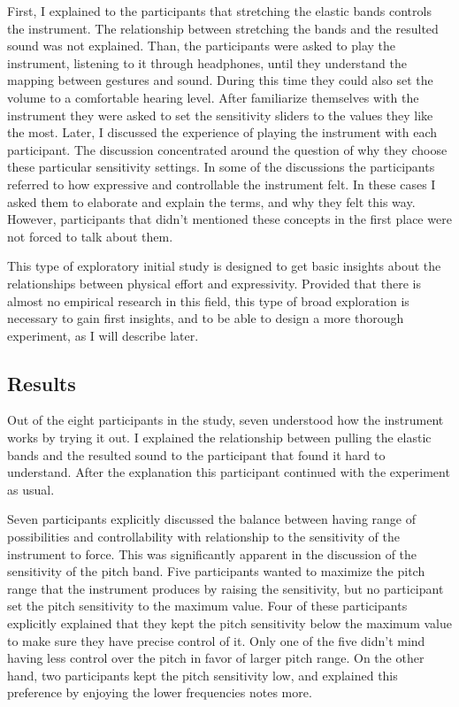 \documentclass{sigchi}
\begin{document}
First, I explained to the participants that stretching the elastic bands controls the instrument.
The relationship between stretching the bands and the resulted sound was not explained.
Than, the participants were asked to play the instrument, listening to it through headphones, until they understand the mapping between gestures and sound.
During this time they could also set the volume to a comfortable hearing level.
After familiarize themselves with the instrument they were asked to set the sensitivity sliders to the values they like the most.
Later, I discussed the experience of playing the instrument with each participant.
The discussion concentrated around the question of why they choose these particular sensitivity settings.
In some of the discussions the participants referred to how expressive and controllable the instrument felt.
In these cases I asked them to elaborate and explain the terms, and why they felt this way.
However, participants that didn't mentioned these concepts in the first place were not forced to talk about them.

This type of exploratory initial study is designed to get basic insights about the relationships between physical effort and expressivity.
Provided that there is almost no empirical research in this field, this type of broad exploration is necessary to gain first insights, and to be able to design a more thorough experiment, as I will describe later.

\subsection{Results}

Out of the eight participants in the study, seven understood how the instrument works by trying it out.
I explained the relationship between pulling the elastic bands and the resulted sound to the participant that found it hard to understand.
After the explanation this participant continued with the experiment as usual.

Seven participants explicitly discussed the balance between having range of possibilities and controllability with relationship to the sensitivity of the instrument to force.
This was significantly apparent in the discussion of the sensitivity of the pitch band.
Five participants wanted to maximize the pitch range that the instrument produces by raising the sensitivity, but no participant set the pitch sensitivity to the maximum value.
Four of these participants explicitly explained that they kept the pitch sensitivity below the maximum value to make sure they have precise control of it.
Only one of the five didn't mind having less control over the pitch in favor of larger pitch range.
On the other hand, two participants kept the pitch sensitivity low, and explained this preference by enjoying the lower frequencies notes more.
\end{document}
